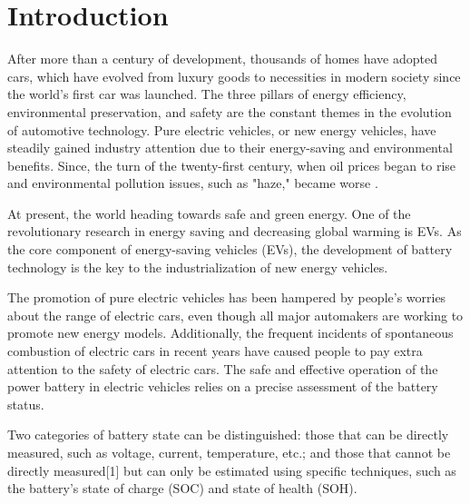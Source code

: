 \chapter*{Introduction}
After more than a century of development, thousands of homes have adopted cars, which have evolved from luxury goods to necessities in modern society since the world's first car was launched. The three pillars of energy efficiency, environmental preservation, and safety are the constant themes in the evolution of automotive technology. Pure electric vehicles, or new energy vehicles, have steadily gained industry attention due to their energy-saving and environmental benefits. Since, the turn of the twenty-first century, when oil prices began to rise and environmental pollution issues, such as "haze," became worse \cite{Real_Time_SOC_Estimation_Based_On_EKF_And_UKF_PTorin_Lei}.

At present, the world heading towards safe and green energy. One of the revolutionary research in energy saving and decreasing global warming is EVs. As the core component of energy-saving vehicles (EVs), the development of battery technology is the key to the industrialization of new energy vehicles. 

The promotion of pure electric vehicles has been hampered by people's worries about the range of electric cars, even though all major automakers are working to promote new energy models. Additionally, the frequent incidents of spontaneous combustion of electric cars in recent years have caused people to pay extra attention to the safety of electric cars. The safe and effective operation of the power battery in electric vehicles relies on a precise assessment of the battery status.

Two categories of battery state can be distinguished: those that can be directly measured, such as voltage, current, temperature, etc.; and those that cannot be directly measured[1] but can only be estimated using specific techniques, such as the battery's state of charge (SOC) and state of health (SOH).